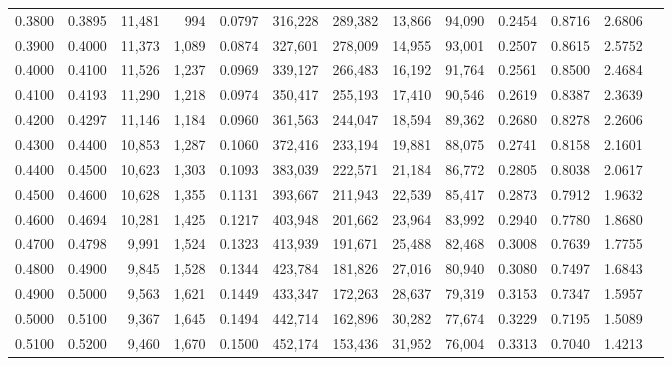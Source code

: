 \begin{tabular}{rrrrrrrrrrrrr}
0.3800 & 0.3895 & 11,481 &   994 &                                     0.0797 & 316,228 & 289,382 &  13,866 &  94,090 & 0.2454 & 0.8716 & 2.6806 \\
0.3900 & 0.4000 & 11,373 & 1,089 &                                     0.0874 & 327,601 & 278,009 &  14,955 &  93,001 & 0.2507 & 0.8615 & 2.5752 \\
0.4000 & 0.4100 & 11,526 & 1,237 &                                     0.0969 & 339,127 & 266,483 &  16,192 &  91,764 & 0.2561 & 0.8500 & 2.4684 \\
0.4100 & 0.4193 & 11,290 & 1,218 &                                     0.0974 & 350,417 & 255,193 &  17,410 &  90,546 & 0.2619 & 0.8387 & 2.3639 \\
0.4200 & 0.4297 & 11,146 & 1,184 &                                     0.0960 & 361,563 & 244,047 &  18,594 &  89,362 & 0.2680 & 0.8278 & 2.2606 \\
0.4300 & 0.4400 & 10,853 & 1,287 &                                     0.1060 & 372,416 & 233,194 &  19,881 &  88,075 & 0.2741 & 0.8158 & 2.1601 \\
0.4400 & 0.4500 & 10,623 & 1,303 &                                     0.1093 & 383,039 & 222,571 &  21,184 &  86,772 & 0.2805 & 0.8038 & 2.0617 \\
0.4500 & 0.4600 & 10,628 & 1,355 &                                     0.1131 & 393,667 & 211,943 &  22,539 &  85,417 & 0.2873 & 0.7912 & 1.9632 \\
0.4600 & 0.4694 & 10,281 & 1,425 &                                     0.1217 & 403,948 & 201,662 &  23,964 &  83,992 & 0.2940 & 0.7780 & 1.8680 \\
0.4700 & 0.4798 &  9,991 & 1,524 &                                     0.1323 & 413,939 & 191,671 &  25,488 &  82,468 & 0.3008 & 0.7639 & 1.7755 \\
0.4800 & 0.4900 &  9,845 & 1,528 &                                     0.1344 & 423,784 & 181,826 &  27,016 &  80,940 & 0.3080 & 0.7497 & 1.6843 \\
0.4900 & 0.5000 &  9,563 & 1,621 &                                     0.1449 & 433,347 & 172,263 &  28,637 &  79,319 & 0.3153 & 0.7347 & 1.5957 \\
0.5000 & 0.5100 &  9,367 & 1,645 &                                     0.1494 & 442,714 & 162,896 &  30,282 &  77,674 & 0.3229 & 0.7195 & 1.5089 \\
0.5100 & 0.5200 &  9,460 & 1,670 &                                     0.1500 & 452,174 & 153,436 &  31,952 &  76,004 & 0.3313 & 0.7040 & 1.4213 \\

\end{tabular}
